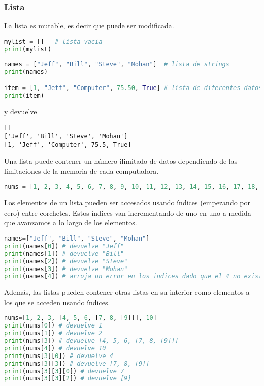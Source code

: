     \subsubsection{Lista}\label{subsubsec: lista}
    La lista es mutable, es decir que puede ser modificada. 
    \begin{lstlisting}[language={python}]
mylist = []   # lista vacia
print(mylist)
    
names = ["Jeff", "Bill", "Steve", "Mohan"]  # lista de strings
print(names)

item = [1, "Jeff", "Computer", 75.50, True] # lista de diferentes datos
print(item)
    \end{lstlisting}
    y devuelve
    \begin{lstlisting}[language={[latex]tex}]
[]
['Jeff', 'Bill', 'Steve', 'Mohan']
[1, 'Jeff', 'Computer', 75.5, True]
    \end{lstlisting}
    Una lista puede contener un número ilimitado de datos dependiendo de las limitaciones de la memoria de cada computadora.
    \begin{lstlisting}[language={python}]
nums = [1, 2, 3, 4, 5, 6, 7, 8, 9, 10, 11, 12, 13, 14, 15, 16, 17, 18, 19, 20, 21, 22, 23, 24, 25, 26, 27, 28, 29, 30, 31, 32, 33, 34, 35, 36, 37, 38, 39, 40, 41, 42, 43, 44, 45, 46, 47, 48, 49, 50, 51, 52, 53, 54, 55, 56, 57, 58, 59, 60]
    \end{lstlisting}
    Los elementos de un lista pueden ser accesados usando índices (empezando por cero) entre corchetes. Estos índices van incrementando de uno en uno a medida que avanzamos a lo largo de los elementos.
    \begin{lstlisting}[language={python}]
names=["Jeff", "Bill", "Steve", "Mohan"] 
print(names[0]) # devuelve "Jeff"
print(names[1]) # devuelve "Bill"
print(names[2]) # devuelve "Steve"
print(names[3]) # devuelve "Mohan"
print(names[4]) # arroja un error en los indices dado que el 4 no existe
    \end{lstlisting}
    Además, las listas pueden contener otras listas en su interior como elementos a los que se acceden usando índices.
    \begin{lstlisting}[language={python}]
nums=[1, 2, 3, [4, 5, 6, [7, 8, [9]]], 10] 
print(nums[0]) # devuelve 1
print(nums[1]) # devuelve 2
print(nums[3]) # devuelve [4, 5, 6, [7, 8, [9]]]
print(nums[4]) # devuelve 10
print(nums[3][0]) # devuelve 4
print(nums[3][3]) # devuelve [7, 8, [9]]
print(nums[3][3][0]) # devuelve 7
print(nums[3][3][2]) # devuelve [9]
    \end{lstlisting}
